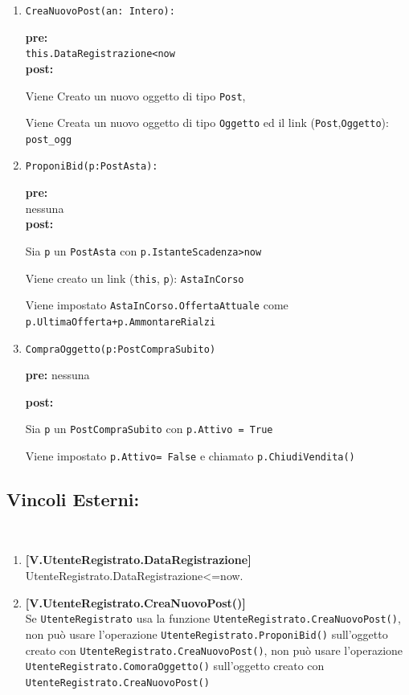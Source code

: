 \documentclass{article}
\begin{document}
\begin{enumerate}
    \item \texttt{CreaNuovoPost(an: Intero):}
    
    \textbf{pre:}\\ \texttt{this.DataRegistrazione<now} \\
    
    \textbf{post:} 
    
    Viene Creato un nuovo oggetto di tipo \texttt{Post},
    
    Viene Creata un nuovo oggetto di tipo \texttt{Oggetto} ed il link (\texttt{Post},\texttt{Oggetto}): \texttt{post\_ogg}
    
    \item \texttt{ProponiBid(p:PostAsta):}
    
    \textbf{pre:}\\ nessuna\\
    
    \textbf{post:}
    
    Sia \texttt{p} un \texttt{PostAsta} con \texttt{p.IstanteScadenza>now}
    
    Viene creato un link (\texttt{this}, \texttt{p}): \texttt{AstaInCorso}
    
    Viene impostato \texttt{AstaInCorso.OffertaAttuale} come \texttt{p.UltimaOfferta+p.AmmontareRialzi}
    
    \item \texttt{CompraOggetto(p:PostCompraSubito)}
    
    \textbf{pre:} nessuna
    
    \textbf{post:}
    
    Sia \texttt{p} un \texttt{PostCompraSubito} con \texttt{p.Attivo = True}
    
    Viene impostato \texttt{p.Attivo= False} e chiamato \texttt{p.ChiudiVendita()}
\end{enumerate}

\subsection{Vincoli Esterni:}\\
\begin{enumerate}
    \item \textbf{[V.UtenteRegistrato.DataRegistrazione]}\\
    {UtenteRegistrato.DataRegistrazione<=now.}
    \item \textbf{[V.UtenteRegistrato.CreaNuovoPost()]}\\
    Se \texttt{UtenteRegistrato} usa la funzione \texttt{UtenteRegistrato.CreaNuovoPost()}, non può usare l'operazione \texttt{UtenteRegistrato.ProponiBid()} sull'oggetto creato con \texttt{UtenteRegistrato.CreaNuovoPost()}, non può usare l'operazione \texttt{UtenteRegistrato.ComoraOggetto()} sull'oggetto creato con \texttt{UtenteRegistrato.CreaNuovoPost()}
\end{enumerate}
\end{document}
